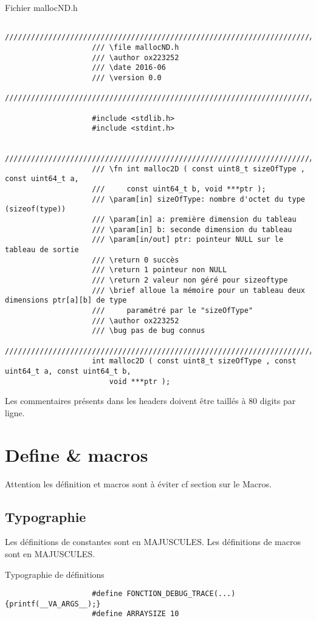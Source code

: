 			\begin{cbox}{Fichier mallocND.h}
				\begin{verbatim}
					////////////////////////////////////////////////////////////////////////////////
					/// \file mallocND.h
					/// \author ox223252
					/// \date 2016-06
					/// \version 0.0
					////////////////////////////////////////////////////////////////////////////////

					#include <stdlib.h>
					#include <stdint.h>

					////////////////////////////////////////////////////////////////////////////////
					/// \fn int malloc2D ( const uint8_t sizeOfType , const uint64_t a,
					/// 	const uint64_t b, void ***ptr );
					/// \param[in] sizeOfType: nombre d'octet du type (sizeof(type))
					/// \param[in] a: première dimension du tableau
					/// \param[in] b: seconde dimension du tableau
					/// \param[in/out] ptr: pointeur NULL sur le tableau de sortie
					/// \return 0 succès
					/// \return 1 pointeur non NULL
					/// \return 2 valeur non géré pour sizeoftype
					/// \brief alloue la mémoire pour un tableau deux dimensions ptr[a][b] de type 
					/// 	paramétré par le "sizeOfType"
					/// \author ox223252
					/// \bug pas de bug connus
					////////////////////////////////////////////////////////////////////////////////
					int malloc2D ( const uint8_t sizeOfType , const uint64_t a, const uint64_t b, 
					    void ***ptr );
				\end{verbatim}
			\end{cbox}

			Les commentaires présents dans les headers doivent être taillés à 80 digits par ligne.
		
	\section{Define \& macros}
		Attention les définition et macros sont à éviter cf section sur le Macros.

		\subsection{Typographie}
			Les définitions de constantes sont en MAJUSCULES. Les définitions de macros sont en MAJUSCULES.

			\begin{cbox}{Typographie de définitions}
				\begin{verbatim}
					#define FONCTION_DEBUG_TRACE(...) {printf(__VA_ARGS__);}
					#define ARRAYSIZE 10
				\end{verbatim}
			\end{cbox}


